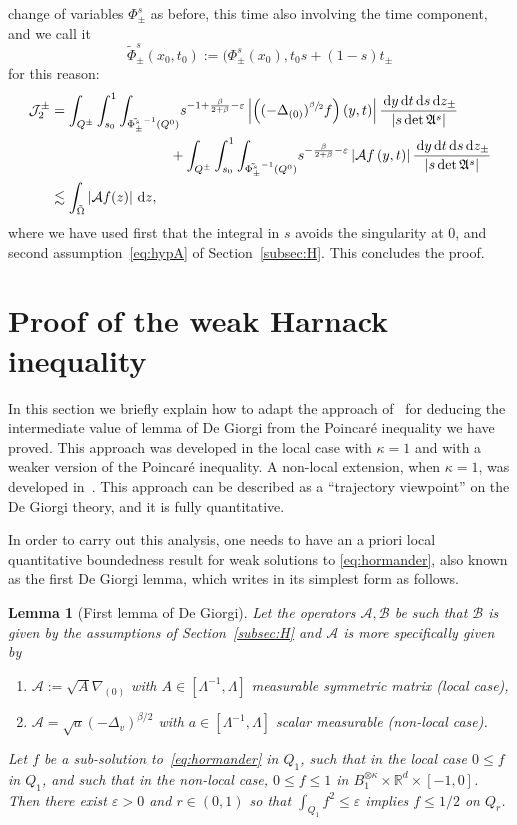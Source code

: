 \documentclass[JEP,XML,SOM,Unicode,NoFloatCountersInSection,published]{cedram}
\newenvironment{enumeratei}
{\bgroup\def\theenumi{\roman{enumi}}\def\theenumii{\arabic{enumii}}\begin{enumerate}}
{\end{enumerate}\egroup}
\newtheorem{lemma}[theorem]{Lemma}
\theoremstyle{definition}
\newcommand\R{{\mathbb R}}
\newcommand{\cA}{{\mathcal A}}
\newcommand{\cB}{{\mathcal B}}
\newcommand{\cJ}{{\mathcal J}}
\newcommand{\dd}{{\, \mathrm d}}
\let\var\varepsilon
\begin{document}
change of variables $\Phi^s_\pm$ as before, this time also involving the time component, and we call it
\[
\tilde{\Phi}^s_\pm(x_0, t_0) := (\Phi^s_\pm(x_0), t_0 s +(1-s) t_\pm
\]
for this reason:
\begin{align*}
\cJ^\pm_2
& = \int_{Q^\pm} \int_{s_0}^1 {\int_{\tilde{\Phi^s_\pm}^{-1}(Q^0)}} s^{-1 + \frac{\beta}{2+\beta}-\var}
\left| \left(
(-\Delta_{(0)})^{\sfrac{\beta}{2}}f\right)\left(
y, t\right) \right| \frac{\dd y \dd t \dd s \dd z_\pm}{\left| {s} \det \mathfrak A^s \right|} \\
&\hspace*{3cm} + \int_{Q^\pm} \int_{s_0}^1 {\int_{\tilde{\Phi^s_\pm}^{-1}(Q^0)}} s^{-\frac{\beta}{2+\beta}-\var}
\left| \cA f \left(
y, t \right) \right| \frac{\dd y \dd t \dd s \dd z_\pm}{\left| {s} \det \mathfrak A^s \right|} \\
&\lesssim
\int_{\tilde \Omega} \left| \cA f(z) \right| \dd z,
\end{align*}
where we have used first that the integral in $s$ avoids the
singularity at $0$, and second assumption~\eqref{eq:hypA}
of Section~\ref{subsec:H}. This concludes the proof.

\section{Proof of the weak Harnack inequality}
\label{sec:DGlemmas}

In this section we briefly explain how to adapt the approach
of~\cite{guerand-mouhot} for deducing the intermediate value of
lemma of De Giorgi from the Poincaré inequality we have proved. This
approach was developed in the local case with $\kappa = 1$ and
with a weaker version of the Poincaré inequality. A non-local
extension, when $\kappa = 1$, was developed
in~\cite{loher-2022-preprint-quantitative-de-giorgi}.
This approach can be described as a ``trajectory viewpoint'' on
the De Giorgi theory, and it is fully quantitative.

In order to carry out this analysis, one needs to have an a priori local quantitative boundedness result
for weak solutions to \eqref{eq:hormander}, also known as the first De
Giorgi lemma, which writes in its simplest form as follows.
\begin{lemma}[First lemma of De Giorgi]
Let the operators $\cA, \cB$ be such that $\cB$ is given by
the assumptions of Section~\ref{subsec:H} and $\cA$ is more specifically given by
\begin{enumeratei}
\item
$\cA:=\sqrt{A} \nabla_{(0)}$ with
$A \in [\Lambda^{-1},\Lambda]$ measurable symmetric matrix (local
case),
\item
$\cA = \sqrt{a} (-\Delta_v)^{\beta/2}$ with
$a \in [\Lambda^{-1},\Lambda]$ scalar measurable (non-local
case).
\end{enumeratei}
Let $f$ be a sub-solution to~\eqref{eq:hormander} in $Q_1$, such that in the local case
$0 \le f$ in $Q_1$, and such that in the non-local case, $0 \le f \le 1$ in
$B_1^{\otimes \kappa}\times \R^d \times [-1, 0]$. Then there exist $\var>0$ and
$r \in (0,1)$ so that $\int_{Q_1} f^2 \le \var$ implies
$f \le 1/2$ on $Q_r$.
\end{lemma}
\end{document}
